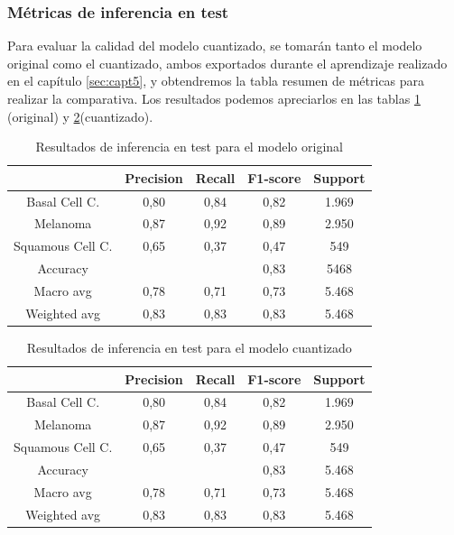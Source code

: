 \subsubsection{Métricas de inferencia en test}
Para evaluar la calidad del modelo cuantizado, se tomarán tanto el modelo original como el cuantizado, ambos exportados durante el aprendizaje realizado en el capítulo \ref{sec:capt5}, y obtendremos la tabla resumen de métricas para realizar la comparativa.
Los resultados  podemos apreciarlos en las tablas \ref{tab:maltestorig} (original) y \ref{tab:maltestquant}(cuantizado).

\begin{table}[!ht]
	\centering
	\begin{tabular}{|c|c|c|c|c|}
		\hline
		~ & Precision & Recall & F1-score & Support \\ \hline
		Basal Cell C. & 0,80 & 0,84 & 0,82 & 1.969 \\
		Melanoma & 0,87 & 0,92 & 0,89 & 2.950 \\
		Squamous Cell C. & 0,65 & 0,37 & 0,47 & 549 \\ \hline
		Accuracy & ~ & ~ & 0,83 & 5468 \\ \hline
		Macro avg & 0,78 & 0,71 & 0,73 & 5.468 \\
		Weighted avg & 0,83 & 0,83 & 0,83 & 5.468 \\ \hline
	\end{tabular}
	\caption{Resultados de inferencia en test para el modelo original}
	\label{tab:maltestorig}
\end{table}

\begin{table}[!ht]
	\centering
	\begin{tabular}{|c|c|c|c|c|}
		\hline
		~ & Precision & Recall & F1-score & Support \\ \hline
		Basal Cell C. & 0,80 & 0,84 & 0,82 & 1.969 \\
		Melanoma & 0,87 & 0,92 & 0,89 & 2.950 \\
		Squamous Cell C. & 0,65 & 0,37 & 0,47 & 549 \\ \hline
		Accuracy & ~ & ~ & 0,83 & 5.468 \\ \hline
		Macro avg & 0,78 & 0,71 & 0,73 & 5.468 \\
		Weighted avg & 0,83 & 0,83 & 0,83 & 5.468 \\ \hline
	\end{tabular}
	\caption{Resultados de inferencia en test para el modelo cuantizado}
	\label{tab:maltestquant}
\end{table}

